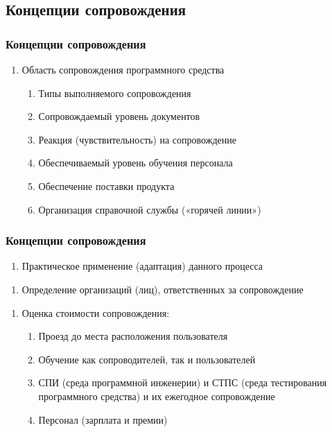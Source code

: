 \documentclass{../industrial-development}
\begin{document}
\subsection{Концепции сопровождения}
\begin{frame} \frametitle{Концепции сопровождения}
	\begin{enumerate}
	\item Область сопровождения программного средства
		\begin{enumerate} 
		\item Типы выполняемого сопровождения
		\item Сопровождаемый уровень документов
		\item Реакция (чувствительность) на сопровождение
		\item Обеспечиваемый уровень обучения персонала 
		\item Обеспечение поставки продукта
		\item Организация справочной службы («горячей линии») 
		\end{enumerate}
	\end{enumerate}
\end{frame}

\lecturenotes

\begin{frame} \frametitle{Концепции сопровождения}
	\begin{enumerate}[2]
	\item Практическое применение (адаптация) данного процесса
	\end{enumerate}
	\begin{enumerate}[3]
	\item Определение организаций (лиц), ответственных за сопровождение
	\end{enumerate}
	\begin{enumerate}[4]
	\item Оценка стоимости сопровождения: 
		\begin{enumerate}
		\item Проезд до места расположения пользователя 
		\item Обучение как сопроводителей, так и пользователей
		\item СПИ (среда программной инженерии) и СТПС (среда тестирования программного средства) и их ежегодное сопровождение
		\item Персонал (зарплата и премии) 
		\end{enumerate}
	\end{enumerate}
\end{frame}
\end{document}
